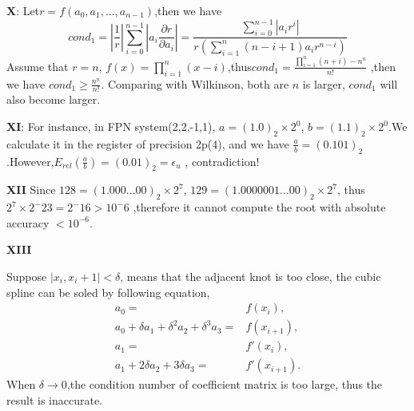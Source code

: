 \documentclass{article}
\begin{document}
\textbf{X}: Let$r= f(a_0,a_1,...,a_{n-1})$,then we have 
\begin{equation*}
    cond_1=|\frac{1}{r}|\displaystyle\sum_{i=0}^{n-1}|a_i\frac{\partial r}{\partial a_i}|=\frac{\displaystyle\sum_{i=0}^{n-1}|a_ir^i|}{r(\displaystyle\sum_{i=1}^{n}(n-i+1)a_ir^{n-i})}
\end{equation*}
Assume that $r=n$, $f(x)=\displaystyle\prod_{i = 1}^{n}(x-i)$,thus$cond_1=\frac{\displaystyle\prod_{i = 1}^{n}(n+i) -n^n}{n!}$ ,then we have $cond_1 \geq \frac{n^n}{n!}$.
Comparing with Wilkinson, both are $n$ is larger, $cond_1$ will also become larger.

\textbf{XI}: For instance, in FPN system(2,2,-1,1), $a=(1.0)_2 \times 2^0$, $b=(1.1)_2 \times 2^0$.We calculate it in the register of precision 2p(4), and we have $\frac{a}{b} = (0.101)_2$.However,$E_{rel}(\frac{a}{b}) = (0.01)_2 = \epsilon_u$ , contradiction!

\textbf{XII}
Since $128 = (1.000...00)_2 \times 2^7$, $129 = (1.0000001...00)_2 \times 2^7$, thus $2^7 \times 2^-23 = 2^-16 > 10^-6$ ,therefore it cannot compute the root with absolute accuracy $<10^{-6}$.

\textbf{XIII}
{
    Suppose $|x_i,x_i+1| < \delta$, means that the adjacent knot is too close, the cubic spline can be soled by following equation, 
            \begin{align*}             
                a_0 =& f(x_i),\\
                a_0 + \delta a_1 + \delta^2 a_2 + \delta^3 a_3 =& f(x_{i+1}),\\
                a_1 =& f'(x_i),\\
                 a_1 +2\delta a_2 + 3\delta a_3 = &f'(x_{i+1}).
            \end{align*}
    When $\delta \rightarrow 0$,the condition number of coefficient matrix is too large, thus the result is inaccurate.

}
\end{document}
